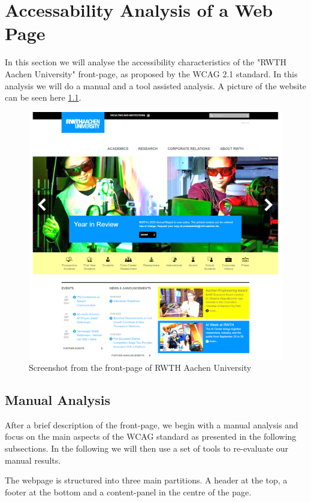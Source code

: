 \chapter{Accessability Analysis of a Web Page}
In this section we will analyse the accessibility characteristics of the "RWTH Aachen University" front-page, as proposed by the WCAG 2.1 standard.
In this analysis we will do a manual and a tool assisted analysis. A picture of the website can be seen here \ref{fig:RWTH_main}.
\begin{figure}
	\includegraphics[width=\linewidth]{figures/caputra_de_pantalla_rwth_main.png}
	\caption{Screenshot from the front-page of RWTH Aachen University}
	\label{fig:RWTH_main}
\end{figure}

\section{Manual Analysis}
After a brief description of the front-page, we begin with a manual analysis and focus on the main aspects of the WCAG standard as presented in the following subsections. In the following we will then use a set of tools to re-evaluate our manual results.


The webpage is structured into three main partitions. A header at the top, a footer at the bottom and a content-panel in the centre of the page.
